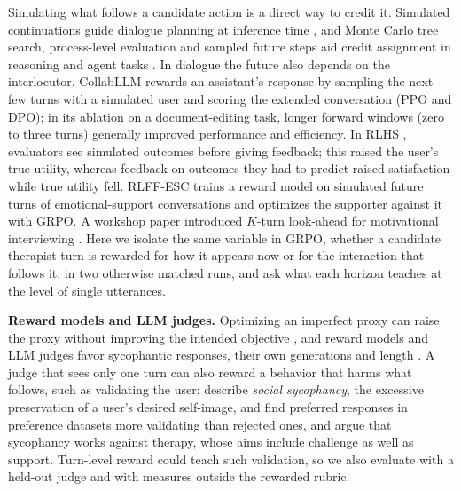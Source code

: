 Simulating what follows a candidate action is a direct way to credit it. Simulated continuations
guide dialogue planning at inference time \citep{yu2023promptmcts, chen2025broaden}, and Monte
Carlo tree search, process-level evaluation and sampled future steps aid credit assignment in
reasoning and agent tasks \citep{xie2024mctsdpo, lightman2024letsverify, li2026patr,
kazemnejad2024vineppo}. In
dialogue the future also depends on the interlocutor. CollabLLM \citep{wu2025collabllm} rewards an
assistant's response by sampling the next few turns with a simulated user and scoring the extended
conversation (PPO and DPO); in its ablation on a document-editing task, longer forward windows
(zero to three turns) generally improved performance and efficiency. In RLHS \citep{liang2025rlhs},
evaluators see simulated outcomes before giving feedback; this raised the user's true utility,
whereas feedback on outcomes they had to predict raised satisfaction while true utility fell. RLFF-ESC
\citep{yang2025rlffesc} trains a reward model on simulated future turns of emotional-support
conversations and optimizes the supporter against it with GRPO. A workshop paper introduced
$K$-turn look-ahead for motivational interviewing \citep{baruch2025pto}. Here we isolate the same
variable in GRPO, whether a candidate therapist turn is rewarded for how it appears now or for the
interaction that follows it, in two otherwise matched runs, and ask what each horizon
teaches at the level of single utterances.

\textbf{Reward models and LLM judges.}
Optimizing an imperfect proxy can raise the proxy without improving the intended objective
\citep{amodei2016concrete, skalse2022defining, pan2022effects, gao2023scaling}, and reward models
and LLM judges favor sycophantic responses, their own generations and length \citep{sharma2024sycophancy,
perez2023discovering, panickssery2024selfpreference, singhal2024long, dubois2024lengthcontrolled}.
A judge that sees only one turn can also reward a behavior that harms what follows, such as
validating the user: \citet{cheng2026elephant} describe \emph{social
sycophancy}, the excessive preservation of a user's desired self-image, and find preferred responses
in preference datasets more validating than rejected ones, and \citet{moore2025stigma} argue that
sycophancy works against therapy, whose aims include challenge as well as support. Turn-level
reward could teach such validation, so we also evaluate with a held-out judge and with measures
outside the rewarded rubric.


